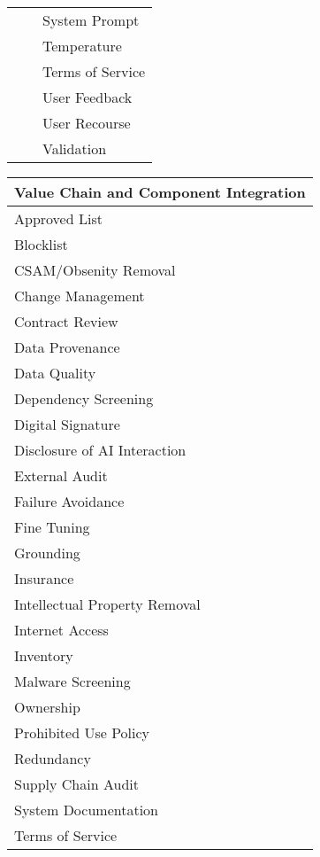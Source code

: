 \documentclass[fleqn]{article}
\begin{document}
\begin{table}[H]
\begin{tabular}{lll}
		&  & System Prompt  \\
		&  & Temperature \\
		&  & Terms of Service \\
		&  & User Feedback \\
		&  & User Recourse \\
		&  & Validation \\
		\bottomrule
	\end{tabular}
	\newline
	\vspace{10pt}
	\newline	
	\begin{tabular}{l}
		\toprule
		\textbf{Value Chain and Component Integration} \\
		\midrule
		Approved List \\
		Blocklist  \\
		CSAM/Obsenity Removal  \\
		Change Management \\
		Contract Review \\
		Data Provenance \\
		Data Quality \\
		Dependency Screening  \\
		Digital Signature \\
		Disclosure of AI Interaction \\
		External Audit \\
		Failure Avoidance \\
		Fine Tuning \\
		Grounding \\
		Insurance \\
		Intellectual Property Removal \\
		Internet Access \\
		Inventory \\
		Malware Screening \\
		Ownership \\
		Prohibited Use Policy \\
		Redundancy \\
		Supply Chain Audit \\
		System Documentation \\
		Terms of Service \\
		\bottomrule
	\end{tabular}	
\end{table}
\end{document}
